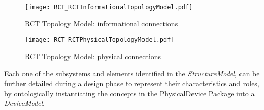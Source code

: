 \begin{description}
\begin{itemize}
\begin{figure}[htbp]
\begin{center}
 {\texttt{[image: RCT\_RCTInformationalTopologyModel.pdf]}}
\end{center}
\caption{RCT Topology Model: informational connections}
\label{fig:RCTinformationaltopologymodel}
\end{figure}

\begin{figure}[htbp]
\begin{center}
 {\texttt{[image: RCT\_RCTPhysicalTopologyModel.pdf]}}
\end{center}
\caption{RCT Topology Model: physical connections}
\label{fig:RCTphysicaltopologymodel}
\end{figure}

Each one of the subsystems and elements identified in the \emph{StructureModel}, can be further detailed during a design phase to represent their characteristics and roles, by ontologically instantiating the concepts in the PhysicalDevice Package into a \emph{DeviceModel}. \\





\end{itemize}


\end{description}

